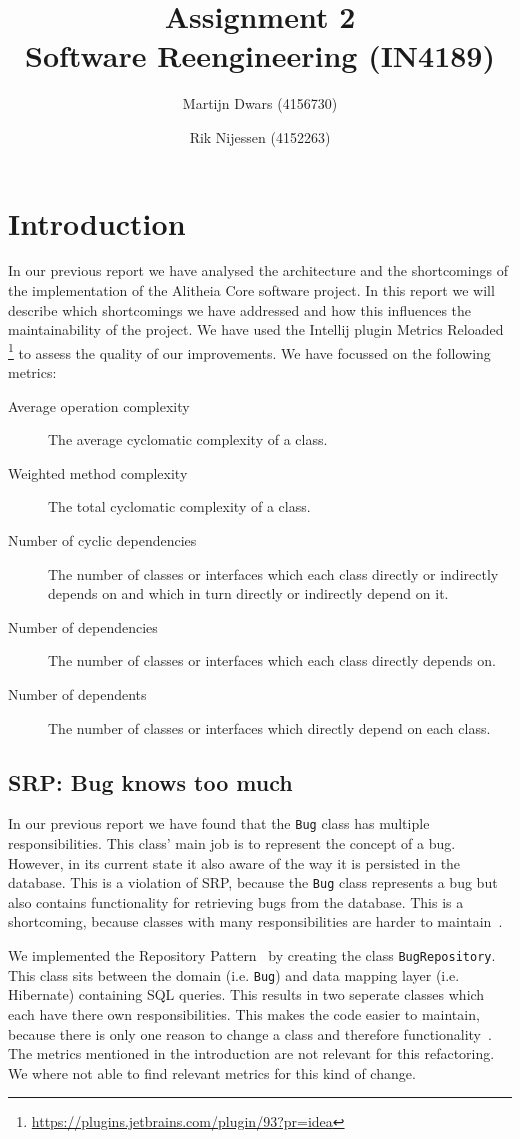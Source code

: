 \documentclass{article}
\author{Martijn Dwars (4156730) \and Rik Nijessen (4152263)}
\title{Assignment 2 \\ Software Reengineering (IN4189)}
\begin{document}
\maketitle

\section{Introduction}
In our previous report we have analysed the architecture and the shortcomings of the implementation of the Alitheia Core software project. In this report we will describe which shortcomings we have addressed and how this influences the maintainability of the project.
We have used the Intellij plugin Metrics Reloaded \footnote{\url{https://plugins.jetbrains.com/plugin/93?pr=idea}} to assess the quality of our improvements. We have focussed on the following metrics:
\begin{description}
\item[Average operation complexity] The average cyclomatic complexity of a class.
\item[Weighted method complexity] The total cyclomatic complexity of a class.
\item[Number of cyclic dependencies]  The number of classes or interfaces which each class directly or indirectly depends on and which in turn directly or indirectly depend on it. 
\item[Number of dependencies] The number of classes or interfaces which each class directly depends on.
\item[Number of dependents] The number of classes or interfaces which directly depend on each class.
\end{description}

\subsection{SRP: Bug knows too much}
In our previous report we have found that the \verb|Bug| class has multiple responsibilities. This class' main job is to represent the concept of a bug. However, in its current state it also aware of the way it is persisted in the database.
This is a violation of SRP, because the \verb|Bug| class represents a bug but also contains functionality for retrieving bugs from the database. This is a shortcoming, because classes with many responsibilities are harder to maintain~\cite{martin2003agile}.

We implemented the Repository Pattern~\cite{repository} by creating the class \verb|BugRepository|. This class sits between the domain (i.e. \verb|Bug|) and data mapping layer (i.e. Hibernate) containing SQL queries.
This results in two seperate classes which each have there own responsibilities. This makes the code easier to maintain, because there is only one reason to change a class and therefore functionality~\cite{martin2003agile}.
The metrics mentioned in the introduction are not relevant for this refactoring. We where not able to find relevant metrics for this kind of change.
\end{document}
